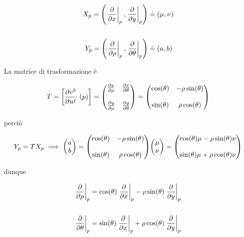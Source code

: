 \begin{align}
	\begin{split}
		X_{p} = \left( \eval{\pdv{x}}_{p}, \eval{\pdv{y}}_{p} \right) &\doteq (\mu,\nu)\\\\
		Y_{p} = \left( \eval{\pdv{\rho}}_{p}, \eval{\pdv{\theta}}_{p} \right) &\doteq (a,b)
	\end{split}
\end{align}

La matrice di trasformazione è

\begin{equation}
	T = \left[ \pdv{v^{k}}{u^{j}}\ (p) \right] = \mqty( \pdv{x}{\rho} & \pdv{x}{\theta} \\\\ \pdv{y}{\rho} & \pdv{y}{\theta} ) %
	= \mqty( \cos(\theta) & - \rho \sin(\theta) \\\\ \sin(\theta) & \rho \cos(\theta) )
\end{equation}

perciò

\begin{equation}
	Y_{p} = T X_{p} %
	\implies %
	\mqty( a \\ b ) = \mqty( \cos(\theta) & - \rho \sin(\theta) \\\\ \sin(\theta) & \rho \cos(\theta) ) \mqty( \mu \\ \nu ) = \mqty( \cos(\theta) \mu - \rho \sin(\theta) \nu \\\\ \sin(\theta) \mu + \rho \cos(\theta) \nu )
\end{equation}

dunque

\begin{align}
	\begin{split}
		\eval{\pdv{\rho}}_{p} &= \cos(\theta) \eval{\pdv{x}}_{p} - \rho \sin(\theta) \eval{\pdv{y}}_{p}\\\\
		\eval{\pdv{\theta}}_{p} &= \sin(\theta) \eval{\pdv{x}}_{p} + \rho \cos(\theta) \eval{\pdv{y}}_{p}
	\end{split}
\end{align}

\tocless\section{}\label{es2-10}

